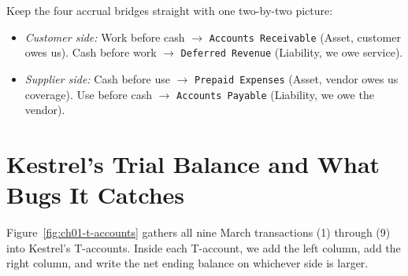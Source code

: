 \begin{intuitionbox}
Keep the four accrual bridges straight with one two-by-two picture:
\begin{itemize}
  \item \emph{Customer side:} Work before cash $\to$ \texttt{Accounts Receivable} (Asset, customer owes us). Cash before work $\to$ \texttt{Deferred Revenue} (Liability, we owe service).
  \item \emph{Supplier side:} Cash before use $\to$ \texttt{Prepaid Expenses} (Asset, vendor owes us coverage). Use before cash $\to$ \texttt{Accounts Payable} (Liability, we owe the vendor).
\end{itemize}
\end{intuitionbox}

\section{Kestrel's Trial Balance and What Bugs It Catches}

Figure~\ref{fig:ch01-t-accounts} gathers all nine March transactions (1) through (9) into Kestrel's T-accounts. Inside each T-account, we add the left column, add the right column, and write the net ending balance on whichever side is larger.

